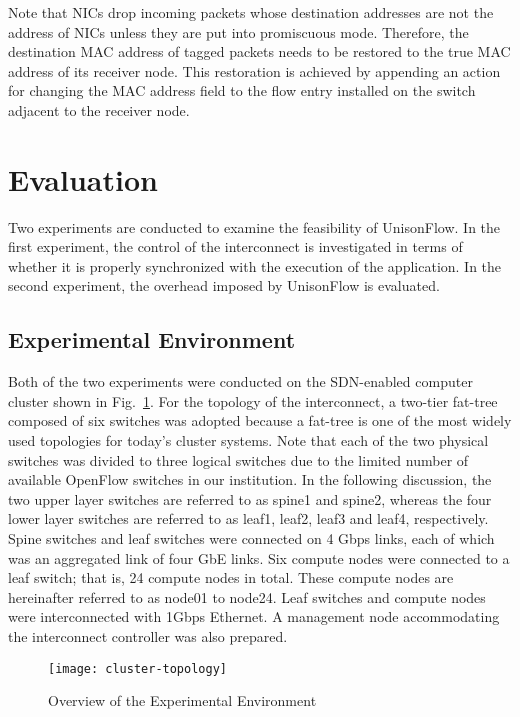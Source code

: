 Note that NICs drop incoming packets whose destination addresses are not
the address of NICs unless they are put into promiscuous mode.
Therefore, the destination MAC address of tagged packets needs to be
restored to the true MAC address of its receiver node. This restoration
is achieved by appending an action for changing the MAC address field to
the flow entry installed on the switch adjacent to the receiver node.

\section{Evaluation}\label{sec:iv-evaluation}

Two experiments are conducted to examine the feasibility of UnisonFlow.
In the first experiment, the control of the interconnect is investigated
in terms of whether it is properly synchronized with the execution of
the application. In the second experiment, the overhead imposed by
UnisonFlow is evaluated.

\subsection{Experimental Environment}

Both of the two experiments were conducted on the SDN-enabled computer
cluster shown in Fig.~\ref{fig:cluster-topology}. For the topology of
the interconnect, a two-tier fat-tree composed of six switches was
adopted because a fat-tree is one of the most widely used topologies for
today's cluster systems. Note that each of the two physical switches was
divided to three logical switches due to the limited number of available
OpenFlow switches in our institution. In the following discussion,
the two upper layer switches are referred to as spine1 and spine2, whereas the
four lower layer switches are referred to as leaf1, leaf2, leaf3 and
leaf4, respectively. Spine switches and leaf switches were connected on
4 Gbps links, each of which was an aggregated link of four GbE links.
Six compute nodes were connected to a leaf switch; that is, 24
compute nodes in total. These compute nodes are hereinafter referred
to as node01 to node24. Leaf switches and compute nodes were
interconnected with 1Gbps Ethernet. A management node accommodating the
interconnect controller was also prepared.

\begin{figure}
    \centering
    \texttt{[image: cluster-topology]}
    \caption{Overview of the Experimental Environment}%
    \label{fig:cluster-topology}
\end{figure}

